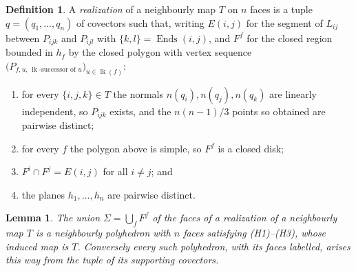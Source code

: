 \documentclass[11pt,reqno]{amsart}
\theoremstyle{plain}
\newtheorem{lemma}[theorem]{Lemma}
\theoremstyle{definition}
\newtheorem{definition}[theorem]{Definition}
\newcommand{\Ends}{\operatorname{Ends}}
\newcommand{\link}{\operatorname{lk}}
\begin{document}
\begin{definition}\label{def:realization}
A \emph{realization} of a neighbourly map $T$ on $n$ faces is a tuple $q=(q_1,\dots,q_n)$ of covectors
such that, writing $E(i,j)$ for the segment of $L_{ij}$ between $P_{ij k}$ and $P_{ij l}$ with
$\{k,l\}=\Ends(i,j)$, and $F^f$ for the closed region bounded in $h_f$ by the closed polygon with
vertex sequence $\big(P_{f,u,\,\link\text{-successor of }u}\big)_{u\in\link(f)}$:
\begin{enumerate}[label=\textup{(R\arabic*)},leftmargin=3.2em]
\item for every $\{i,j,k\}\in T$ the normals $n(q_i),n(q_j),n(q_k)$ are linearly independent, so
  $P_{ijk}$ exists, and the $n(n-1)/3$ points so obtained are pairwise distinct;
\item for every $f$ the polygon above is simple, so $F^f$ is a closed disk;
\item $F^i\cap F^j=E(i,j)$ for all $i\ne j$; and
\item the planes $h_1,\dots,h_n$ are pairwise distinct.
\end{enumerate}
\end{definition}

\begin{lemma}\label{lem:bridge}
The union $\Sigma=\bigcup_f F^f$ of the faces of a realization of a neighbourly map $T$ is a
neighbourly polyhedron with $n$ faces satisfying \textup{(H1)}--\textup{(H3)}, whose induced map is
$T$. Conversely every such polyhedron, with its faces labelled, arises this way from the tuple of its
supporting covectors.
\end{lemma}
\end{document}
